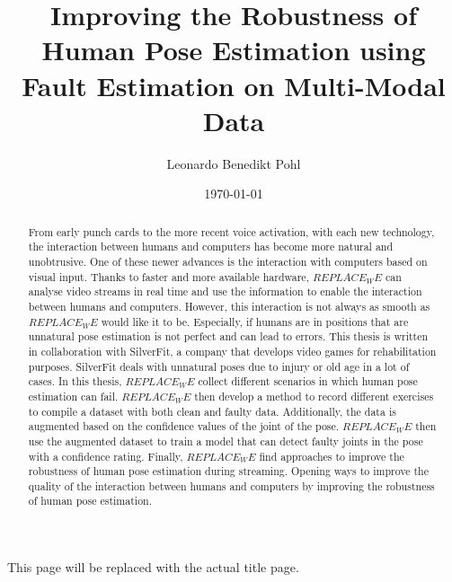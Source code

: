 
\title{Improving the Robustness of Human Pose Estimation using Fault Estimation on Multi-Modal Data}
\author{Leonardo Benedikt Pohl}

\date{\today}

This page will be replaced with the actual title page.

\clearpage

\begin{abstract}
    
  From early punch cards to the more recent voice activation, with each new technology, the interaction between humans and computers has become more natural and unobtrusive. One of these newer advances is the interaction with computers based on visual input. Thanks to faster and more available hardware, $REPLACE_WE$ can analyse video streams in real time and use the information to enable the interaction between humans and computers. However, this interaction is not always as smooth as $REPLACE_WE$ would like it to be. Especially, if humans are in positions that are unnatural pose estimation is not perfect and can lead to errors. This thesis is written in collaboration with SilverFit, a company that develops video games for rehabilitation purposes. SilverFit deals with unnatural poses due to injury or old age in a lot of cases. In this thesis, $REPLACE_WE$ collect different scenarios in which human pose estimation can fail. $REPLACE_WE$ then develop a method to record different exercises to compile a dataset with both clean and faulty data.  Additionally, the data is augmented based on the confidence values of the joint of the pose. $REPLACE_WE$ then use the augmented dataset to train a model that can detect faulty joints in the pose with a confidence rating. Finally, $REPLACE_WE$ find approaches to improve the robustness of human pose estimation during streaming. Opening ways to improve the quality of the interaction between humans and computers by improving the robustness of human pose estimation.
   
\end{abstract}

